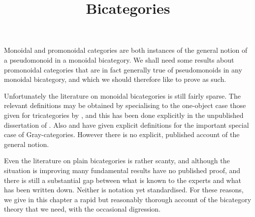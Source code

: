 \documentclass{robinthesisdraft}
\title{Bicategories}
\begin{document}
\maketitle

Monoidal and promonoidal categories are both instances of the
general notion of a pseudomonoid in a monoidal bicategory. We
shall need some results about promonoidal categories that are
in fact generally true of pseudomonoids in any monoidal bicategory,
and which we should therefore like to prove as such.

Unfortunately the literature on monoidal bicategories is still fairly sparse.
The relevant definitions may be obtained by specialising to the one-object
case those given for tricategories by \citet{GPS}, and this has been done
explicitly in the unpublished dissertation of \citet{CarmodyThesis}.
Also \citet{MonBicat} and \citet{HDA1} have given explicit definitions for
the important special case of Gray-categories. However there is no explicit,
published account of the general notion.

Even the literature on plain bicategories is rather scanty, and although
the situation is improving \citep[see][for example]{LackCompanion} many
fundamental results have no published proof, and there is still a
substantial gap between what is known to the experts and what has been
written down. Neither is notation
yet standardised. For these reasons, we give in this chapter a rapid
but reasonably thorough account of the bicategory theory that we need,
with the occasional digression.
\end{document}
